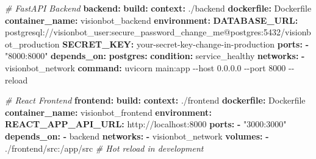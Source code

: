 \documentclass[
]{article}
\newenvironment{Shaded}{\begin{snugshade}}{\end{snugshade}}
\newcommand{\AttributeTok}[1]{\textcolor[rgb]{0.13,0.29,0.53}{#1}}
\newcommand{\CommentTok}[1]{\textcolor[rgb]{0.56,0.35,0.01}{\textit{#1}}}
\newcommand{\FunctionTok}[1]{\textcolor[rgb]{0.13,0.29,0.53}{\textbf{#1}}}
\newcommand{\KeywordTok}[1]{\textcolor[rgb]{0.13,0.29,0.53}{\textbf{#1}}}
\newcommand{\StringTok}[1]{\textcolor[rgb]{0.31,0.60,0.02}{#1}}
\begin{document}
\begin{Shaded}
\begin{Highlighting}[]
\CommentTok{  \# FastAPI Backend}
\AttributeTok{  }\FunctionTok{backend}\KeywordTok{:}
\AttributeTok{    }\FunctionTok{build}\KeywordTok{:}
\AttributeTok{      }\FunctionTok{context}\KeywordTok{:}\AttributeTok{ ./backend}
\AttributeTok{      }\FunctionTok{dockerfile}\KeywordTok{:}\AttributeTok{ Dockerfile}
\AttributeTok{    }\FunctionTok{container\_name}\KeywordTok{:}\AttributeTok{ visionbot\_backend}
\AttributeTok{    }\FunctionTok{environment}\KeywordTok{:}
\AttributeTok{      }\FunctionTok{DATABASE\_URL}\KeywordTok{:}\AttributeTok{ postgresql://visionbot\_user:secure\_password\_change\_me@postgres:5432/visionbot\_production}
\AttributeTok{      }\FunctionTok{SECRET\_KEY}\KeywordTok{:}\AttributeTok{ your{-}secret{-}key{-}change{-}in{-}production}
\AttributeTok{    }\FunctionTok{ports}\KeywordTok{:}
\AttributeTok{      }\KeywordTok{{-}}\AttributeTok{ }\StringTok{"8000:8000"}
\AttributeTok{    }\FunctionTok{depends\_on}\KeywordTok{:}
\AttributeTok{      }\FunctionTok{postgres}\KeywordTok{:}
\AttributeTok{        }\FunctionTok{condition}\KeywordTok{:}\AttributeTok{ service\_healthy}
\AttributeTok{    }\FunctionTok{networks}\KeywordTok{:}
\AttributeTok{      }\KeywordTok{{-}}\AttributeTok{ visionbot\_network}
\AttributeTok{    }\FunctionTok{command}\KeywordTok{:}\AttributeTok{ uvicorn main:app {-}{-}host 0.0.0.0 {-}{-}port 8000 {-}{-}reload}

\CommentTok{  \# React Frontend}
\AttributeTok{  }\FunctionTok{frontend}\KeywordTok{:}
\AttributeTok{    }\FunctionTok{build}\KeywordTok{:}
\AttributeTok{      }\FunctionTok{context}\KeywordTok{:}\AttributeTok{ ./frontend}
\AttributeTok{      }\FunctionTok{dockerfile}\KeywordTok{:}\AttributeTok{ Dockerfile}
\AttributeTok{    }\FunctionTok{container\_name}\KeywordTok{:}\AttributeTok{ visionbot\_frontend}
\AttributeTok{    }\FunctionTok{environment}\KeywordTok{:}
\AttributeTok{      }\FunctionTok{REACT\_APP\_API\_URL}\KeywordTok{:}\AttributeTok{ http://localhost:8000}
\AttributeTok{    }\FunctionTok{ports}\KeywordTok{:}
\AttributeTok{      }\KeywordTok{{-}}\AttributeTok{ }\StringTok{"3000:3000"}
\AttributeTok{    }\FunctionTok{depends\_on}\KeywordTok{:}
\AttributeTok{      }\KeywordTok{{-}}\AttributeTok{ backend}
\AttributeTok{    }\FunctionTok{networks}\KeywordTok{:}
\AttributeTok{      }\KeywordTok{{-}}\AttributeTok{ visionbot\_network}
\AttributeTok{    }\FunctionTok{volumes}\KeywordTok{:}
\AttributeTok{      }\KeywordTok{{-}}\AttributeTok{ ./frontend/src:/app/src}\CommentTok{  \# Hot reload in development}


\end{Highlighting}
\end{Shaded}
\end{document}
